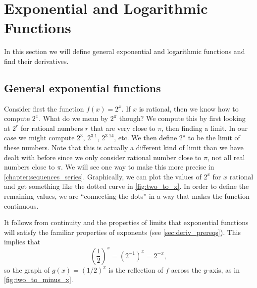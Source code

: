 \section{Exponential and Logarithmic Functions}\label{sec:exp_log}

In this section we will define general exponential and logarithmic functions and find their derivatives. 

\subsection*{General exponential functions}

Consider first the function $f(x)=2^x$. If $x$ is rational, then we know how to compute $2^x$. What do we mean by $2^\pi$ though? We compute this by first looking at $2^r$ for rational numbers $r$ that are very close to $\pi$, then finding a limit. In our case we might compute $2^3$, $2^{3.1}$, $2^{3.14}$, etc. We then define $2^\pi$ to be the limit of these numbers. Note that this is actually a different kind of limit than we have dealt with before since we only consider rational number close to $\pi$, not all real numbers close to $\pi$. We will see one way to make this more precise in \autoref{chapter:sequences_series}. Graphically, we can plot the values of $2^x$ for $x$ rational and get something like the dotted curve in \autoref{fig:two_to_x}. In order to define the remaining values, we are ``connecting the dots'' in a way that makes the function continuous.

It follows from continuity and the properties of limits that exponential functions will satisfy the familiar properties of exponents (see \autoref{sec:deriv_prereqs}).  This implies that
\[\left(\frac12\right)^x =(2^{-1})^x=2^{-x},\]
so the graph of $g(x)=(1/2)^x$ is the reflection of $f$ across the $y$-axis, as in \autoref{fig:two_to_minus_x}.

